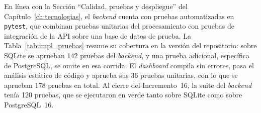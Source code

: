 En línea con la Sección ``Calidad, pruebas y despliegue'' del Capítulo~\ref{ch:tecnologias}, el \textit{backend} cuenta con pruebas automatizadas en \texttt{pytest}, que combinan pruebas unitarias del procesamiento con pruebas de integración de la API sobre una base de datos de prueba. La Tabla~\ref{tab:impl_pruebas} resume su cobertura en la versión \texttt{\commitpruebas} del repositorio: sobre SQLite se aprueban 142 pruebas del \textit{backend}, y una prueba adicional, específica de PostgreSQL, se omite en esa corrida. El \textit{dashboard} compila sin errores, pasa el análisis estático de código y aprueba sus 36 pruebas unitarias, con lo que se aprueban 178 pruebas en total. Al cierre del Incremento~16, la suite del \textit{backend} tenía 120 pruebas, que se ejecutaron en verde tanto sobre SQLite como sobre PostgreSQL~16.

